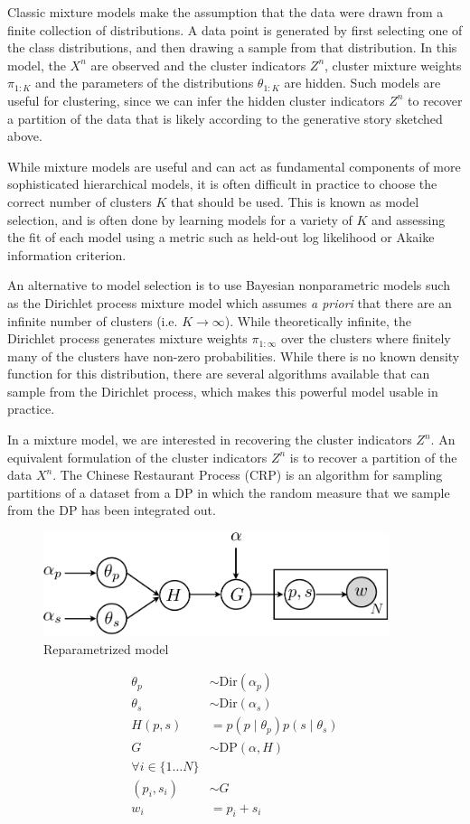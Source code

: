 Classic mixture models make the assumption that the data were drawn
from a finite collection of distributions. A data point is generated
by first selecting one of the class distributions, and then drawing a
sample from that distribution. In this model, the $X^n$ are observed
and the cluster indicators $Z^n$, cluster mixture weights $\pi_{1:K}$
and the parameters of the distributions $\theta_{1:K}$ are
hidden. Such models are useful for clustering, since we can infer the
hidden cluster indicators $Z^n$ to recover a partition of the data
that is likely according to the generative story sketched above.

While mixture models are useful and can act as fundamental components
of more sophisticated hierarchical models, it is often difficult in
practice to choose the correct number of clusters $K$ that should be
used. This is known as model selection, and is often done by learning
models for a variety of $K$ and assessing the fit of each model using
a metric such as held-out log likelihood or Akaike information
criterion.

An alternative to model selection is to use Bayesian nonparametric
models such as the Dirichlet process mixture model \cite{antoniak1974}
which assumes \textit{a priori} that there are an infinite number of
clusters (i.e. $K \to \infty$). While theoretically infinite, the
Dirichlet process generates mixture weights $\pi_{1:\infty}$ over the
clusters where finitely many of the clusters have non-zero
probabilities. While there is no known density function for this
distribution, there are several algorithms available that can sample
from the Dirichlet process, which makes this powerful model usable in
practice.

In a mixture model, we are interested in recovering the cluster
indicators $Z^n$. An equivalent formulation of the cluster indicators
$Z^n$ is to recover a partition of the data $X^n$. The Chinese
Restaurant Process (CRP) is an algorithm for sampling partitions of a
dataset from a DP in which the random measure that we sample from the
DP has been integrated out.

\begin{figure}[h]
\centering
\includegraphics[width=0.9\textwidth]{fig/v2}
\caption{Reparametrized model}
\label{fig:v1}
\end{figure}

\begin{align*}
\theta_p & \sim \text{Dir}(\alpha_p) \\
\theta_s & \sim \text{Dir}(\alpha_s) \\
H(p, s) & = p(p \mid \theta_p) p(s \mid \theta_s) \\
G & \sim \text{DP}\left(\alpha, H\right)\\
\forall i \in \{1 \dots N\} \\
(p_i, s_i) & \sim G \\
w_i & = p_i+s_i
\end{align*}
